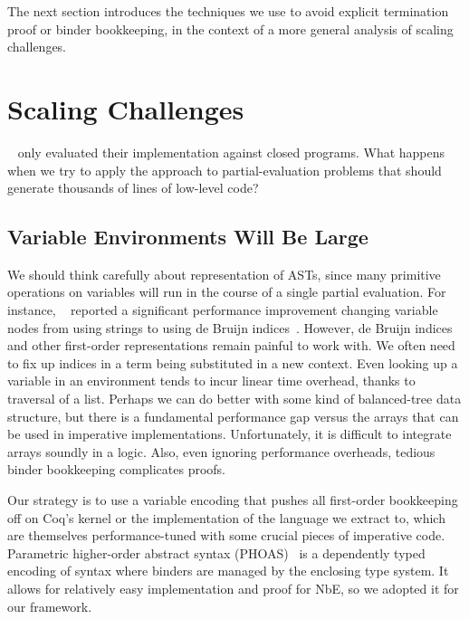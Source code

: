 \documentclass[a4paper,USenglish,cleveref,autoref,thm-restate]{lipics-v2021}
\newcommand{\citet}[1]{\usebibentry{#1}{citet}~\cite{#1}}
\begin{document}
The next section introduces the techniques we use to avoid explicit termination proof or binder bookkeeping, in the context of a more general analysis of scaling challenges.


\section{Scaling Challenges}\label{sec:scaling}

\citet{Aehlig} only evaluated their implementation against closed programs.
What happens when we try to apply the approach to partial-evaluation problems that should generate thousands of lines of low-level code?

\subsection{Variable Environments Will Be Large}\label{sec:PHOAS}
We should think carefully about representation of ASTs, since many primitive operations on variables will run in the course of a single partial evaluation.
For instance, \citet{Aehlig} reported a significant performance improvement changing variable nodes from using strings to using de Bruijn indices~\cite{debruijn1972}.
However, de Bruijn indices and other first-order representations remain painful to work with.
We often need to fix up indices in a term being substituted in a new context.
Even looking up a variable in an environment tends to incur linear time overhead, thanks to traversal of a list.
Perhaps we can do better with some kind of balanced-tree data structure, but there is a fundamental performance gap versus the arrays that can be used in imperative implementations.
Unfortunately, it is difficult to integrate arrays soundly in a logic.
Also, even ignoring performance overheads, tedious binder bookkeeping complicates proofs.

Our strategy is to use a variable encoding that pushes all first-order bookkeeping off on Coq's kernel or the implementation of the language we extract to, which are themselves performance-tuned with some crucial pieces of imperative code.
Parametric higher-order abstract syntax (PHOAS)~\cite{PhoasICFP08} is a dependently typed encoding of syntax where binders are managed by the enclosing type system.
It allows for relatively easy implementation and proof for NbE, so we adopted it for our framework.
\end{document}
